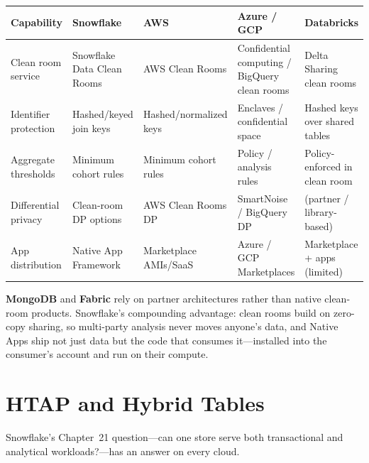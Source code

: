 \begin{center}
\footnotesize
\begin{tabular}{@{}p{2.5cm}p{2.9cm}p{2.7cm}p{2.9cm}p{2.9cm}@{}}
\toprule
\textbf{Capability} & \textbf{Snowflake} & \textbf{AWS} & \textbf{Azure / GCP} & \textbf{Databricks} \\
\midrule
Clean room service & Snowflake Data Clean Rooms & AWS Clean Rooms & Confidential computing / BigQuery clean rooms & Delta Sharing clean rooms \\
Identifier protection & Hashed/keyed join keys & Hashed/normalized keys & Enclaves / confidential space & Hashed keys over shared tables \\
Aggregate thresholds & Minimum cohort rules & Minimum cohort rules & Policy / analysis rules & Policy-enforced in clean room \\
Differential privacy & Clean-room DP options & AWS Clean Rooms DP & SmartNoise / BigQuery DP & (partner / library-based) \\
App distribution & Native App Framework & Marketplace AMIs/SaaS & Azure / GCP Marketplaces & Marketplace + apps (limited) \\
\bottomrule
\end{tabular}
\end{center}

\noindent \textbf{MongoDB} and \textbf{Fabric} rely on partner architectures rather than native
clean-room products. Snowflake's compounding advantage: clean rooms build on zero-copy sharing,
so multi-party analysis never moves anyone's data, and Native Apps ship not just data but the
code that consumes it---installed into the consumer's account and run on their compute.

\section{HTAP and Hybrid Tables}
%
Snowflake's Chapter~21 question---can one store serve both transactional and analytical
workloads?---has an answer on every cloud.

